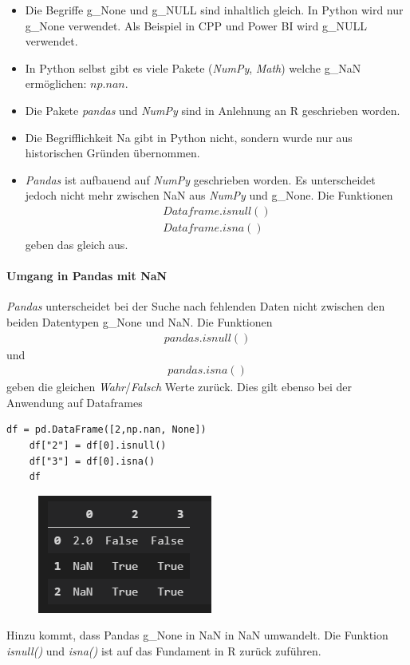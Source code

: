 \begin{itemize}
	\item Die Begriffe \gls{g_None} und \gls{g_NULL} sind inhaltlich gleich. In Python wird nur \gls{g_None} verwendet. Als Beispiel in \gls{CPP} und Power BI wird \gls{g_NULL} verwendet.
	\item In Python selbst gibt es viele Pakete (\textit{NumPy}, \textit{Math}) welche \gls{g_NaN} ermöglichen: $np.nan$.
	\item Die Pakete \textit{pandas} und \textit{NumPy} sind in Anlehnung an \gls{R} geschrieben worden.
	\item Die Begrifflichkeit \gls{Na} gibt in Python nicht, sondern wurde nur aus historischen Gründen übernommen.
	\item \textit{Pandas} ist aufbauend auf \textit{NumPy} geschrieben worden. Es unterscheidet jedoch nicht mehr zwischen NaN aus \textit{NumPy} und \gls{g_None}. Die Funktionen 
	\begin{align}
		Dataframe.isnull()\\
		Dataframe.isna()
	\end{align}
	geben das gleich aus.
\end{itemize}

\paragraph{Umgang in Pandas mit NaN}
\textit{Pandas} unterscheidet bei der Suche nach fehlenden Daten nicht zwischen den beiden Datentypen \gls{g_None} und \gls{NaN}. Die Funktionen
\begin{align}
	pandas.isnull()
\end{align}
und 
\begin{align}
	pandas.isna()
\end{align}
geben die gleichen \textit{Wahr}/\textit{Falsch} Werte zurück. Dies gilt ebenso bei der Anwendung auf Dataframes 
\begin{lstlisting}[style=Python]
	df = pd.DataFrame([2,np.nan, None])
	df["2"] = df[0].isnull()
	df["3"] = df[0].isna()
	df
\end{lstlisting}
\begin{figure}[H]
	\centering
	\includegraphics[scale = 0.8]{attachment/chapter_4/Scc008}
\end{figure}
Hinzu kommt, dass Pandas \gls{g_None} in \gls{NaN} in \gls{NaN} umwandelt. Die Funktion \textit{isnull()} und \textit{isna()} ist auf das Fundament in \gls{R} zurück zuführen.\\

